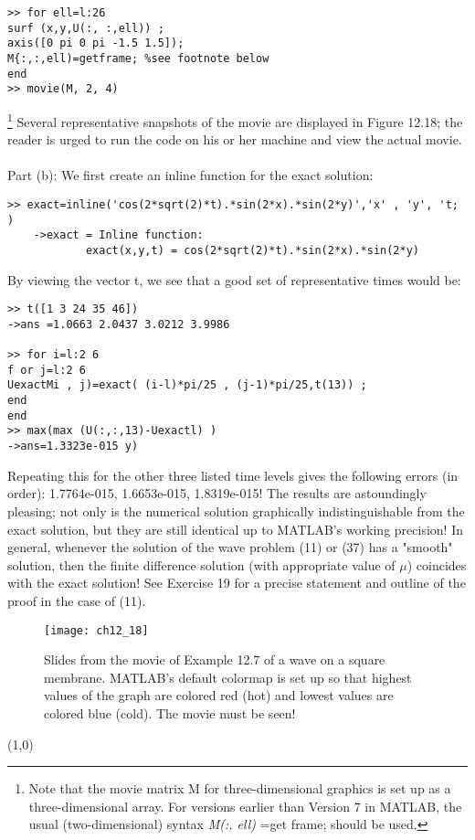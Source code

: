 \documentclass[../main.tex]{subfiles}
\begin{document}
{{\begin{lstlisting}[numbers=none,frame=none]
>> for ell=l:26 
surf (x,y,U(:, :,ell)) ; 
axis([0 pi 0 pi -1.5 1.5]); 
M{:,:,ell)=getframe; %see footnote below 
end 
>> movie(M, 2, 4)
\end{lstlisting}\footnote{Note that the movie matrix M for three-dimensional graphics is set up as a three-dimensional array. For versions earlier than Version 7 in MATLAB, the usual (two-dimensional) syntax \textit{M(:, ell)} =get frame; should be used.}
Several representative snapshots of the movie are displayed in Figure 12.18; the reader is urged to run the code on his or her machine and view the actual movie. 
\\
\\
Part (b): We first create an inline function for the exact solution:
\begin{lstlisting}[numbers=none,frame=none] 
>> exact=inline('cos(2*sqrt(2)*t).*sin(2*x).*sin(2*y)','x' , 'y', 't; ) 
	->exact = Inline function: 
			exact(x,y,t) = cos(2*sqrt(2)*t).*sin(2*x).*sin(2*y)
\end{lstlisting}
By viewing the vector t, we see that a good set of representative times would be: 
\begin{lstlisting}[numbers=none,frame=none] 
>> t([1 3 24 35 46]) 
->ans =1.0663 2.0437 3.0212 3.9986 

>> for i=l:2 6 
f or j=l:2 6 
UexactMi , j)=exact( (i-l)*pi/25 , (j-1)*pi/25,t(13)) ; 
end 
end 
>> max(max (U(:,:,13)-Uexactl) ) 
->ans=1.3323e-015 y)
\end{lstlisting}
Repeating this for the other three listed time levels gives the following errors (in order): 1.7764e-015, 1.6653e-015, 1.8319e-015! The results are astoundingly pleasing; not only is the numerical solution graphically indistinguishable from the exact solution, but they are still identical up to MATLAB's working precision! In general, whenever the solution of the wave problem (11) or (37) has a "smooth"  solution, then the finite difference solution (with appropriate value of $\mu$) coincides with the exact solution! See Exercise 19 for a precise statement and outline of the proof in the case of (11). 
\begin{figure}[H]
	\centering
	\texttt{[image: ch12\_18]}
	\caption{\textsf{Slides from the movie of Example 12.7 of a wave on a square membrane. 
MATLAB's default colormap is set up so that highest values of the graph are colored red 
(hot) and lowest values are colored blue (cold). The movie must be seen!}}
	\label{pfig:ch12_18}
\end{figure}
\line(1,0){\textwidth}
}}
\end{document}
